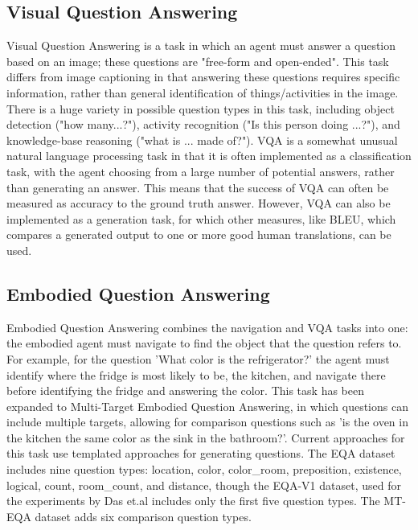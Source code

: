 \documentclass{article}
\begin{document}

\subsection{Visual Question Answering}
Visual Question Answering is a task in which an agent must answer a question based on an image; these questions are "free-form and open-ended"\cite{vqa_2015}. This task differs from image captioning in that answering these questions requires specific information, rather than general identification of things/activities in the image. There is a huge variety in possible question types in this task, including object detection ("how many...?"), activity recognition ("Is this person doing ...?"), and knowledge-base reasoning ("what is ... made of?"). 
VQA is a somewhat unusual natural language processing task in that it is often implemented as a classification task, with the agent choosing from a large number of potential answers, rather than generating an answer. This means that the success of VQA can often be measured as accuracy to the ground truth answer. However, VQA can also be implemented as a generation task, for which other measures, like BLEU, which compares a generated output to one or more good human translations, can be used\cite{bleu}. 

\subsection{Embodied Question Answering}
Embodied Question Answering combines the navigation and VQA tasks into one: the embodied agent must navigate to find the object that the question refers to\cite{embodiedqa}. For example, for the question 'What color is the refrigerator?' the agent must identify where the fridge is most likely to be, the kitchen, and navigate there before identifying the fridge and answering the color. This task has been expanded to Multi-Target Embodied Question Answering, in which questions can include multiple targets, allowing for comparison questions such as 'is the oven in the kitchen the same color as the sink in the bathroom?'\cite{eqa_multitarget}. Current approaches for this task use templated approaches for generating questions. The EQA dataset includes nine question types: location, color, color\_room, preposition, existence, logical, count, room\_count, and distance, though the EQA-V1 dataset, used for the experiments by Das et.al includes only the first five question types\cite{embodiedqa}. The MT-EQA dataset adds six comparison question types\cite{eqa_multitarget}.
\end{document}
